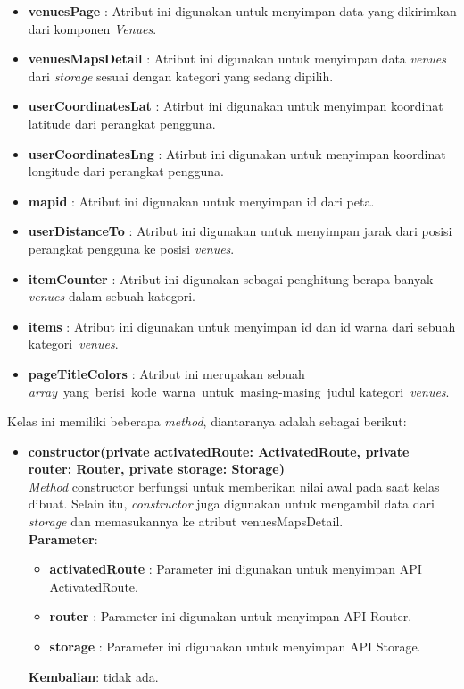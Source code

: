 \begin{enumerate}
				\begin{itemize}
					\item \textbf{venuesPage} : Atribut ini digunakan untuk menyimpan data yang dikirimkan dari komponen \textit{Venues}.
					\item \textbf{venuesMapsDetail} : Atribut ini digunakan untuk menyimpan data \textit{venues} dari \textit{storage} sesuai dengan kategori yang sedang dipilih.
					\item \textbf{userCoordinatesLat} : Atirbut ini digunakan untuk menyimpan koordinat latitude dari perangkat pengguna.
					\item \textbf{userCoordinatesLng} : Atirbut ini digunakan untuk menyimpan koordinat longitude dari perangkat pengguna.
					\item \textbf{mapid} : Atribut ini digunakan untuk menyimpan id dari peta.
					\item \textbf{userDistanceTo} : Atribut ini digunakan untuk menyimpan jarak dari posisi perangkat pengguna ke posisi \textit{venues}.
					\item \textbf{itemCounter} : Atribut ini digunakan sebagai penghitung berapa banyak \textit{venues} dalam sebuah kategori.
					\item \textbf{items} : Atribut ini digunakan untuk menyimpan id dan id warna dari sebuah kategori~\textit{venues}.
					\item \textbf{pageTitleColors} : Atribut ini merupakan sebuah \textit{array}~yang~berisi~kode~warna~untuk~masing-masing~judul kategori~\textit{venues}.
				\end{itemize} 
				Kelas ini memiliki beberapa \textit{method}, diantaranya adalah sebagai berikut:
				\begin{itemize}
					\item \textbf{constructor(private activatedRoute: ActivatedRoute, private router: Router, private storage: Storage)} \\
					
						\textit{Method} constructor berfungsi untuk memberikan nilai awal pada saat kelas dibuat. Selain itu, \textit{constructor} juga digunakan untuk mengambil data dari \textit{storage} dan memasukannya ke atribut venuesMapsDetail.\\
						\textbf{Parameter}:
						\begin{itemize}
							\item \textbf{activatedRoute} : Parameter ini digunakan untuk menyimpan API ActivatedRoute.
							\item \textbf{router} : Parameter ini digunakan untuk menyimpan API Router.
							\item \textbf{storage} : Parameter ini digunakan untuk menyimpan API Storage.
						\end{itemize}
						\textbf{Kembalian}: tidak ada.
						

\end{itemize}
\end{enumerate}
